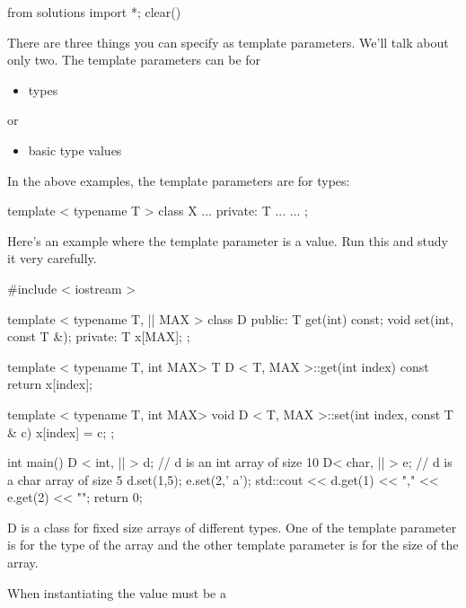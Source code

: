 \begin{python0}
from solutions import *; clear()
\end{python0}

There are three things you can specify as template parameters.
We'll talk about only two. The template parameters can be for

\begin{itemize}
\item
  types
\end{itemize}
or
\begin{itemize}
\item
  basic type values
\end{itemize}

In the above examples, the template parameters are for types:

\begin{console}
template  < typename T >
class X
{
...
private:
     T ...
...
}; 
\end{console}

Here's an example where the template parameter is a value. Run this and
study it very carefully.

\begin{consolethree}[escapeinside=||]
#include < iostream >

template < typename T, || MAX >
class D
{
public:
     T get(int) const;
     void set(int, const T &);
private:
     T x[MAX];
};

template < typename T, int MAX>
T D < T, MAX >::get(int index) const
{    
     return x[index];
}

template < typename T, int MAX>
void D < T, MAX >::set(int index, const T & c)
{    
     x[index] = c;
};

int main()
{   
     D < int, || > d; // d is an int array of size 10
     D< char, || > e; // d is a char array of size 5
     d.set(1,5);
     e.set(2,' a');
     std::cout << d.get(1) << ","
               << e.get(2) << "\n";
     return 0;
}
 
\end{consolethree}

D is a class for fixed size arrays of different types. One of the template parameter is for the type of the array and the other template parameter is for the size of the array.

When instantiating the value must be a 

